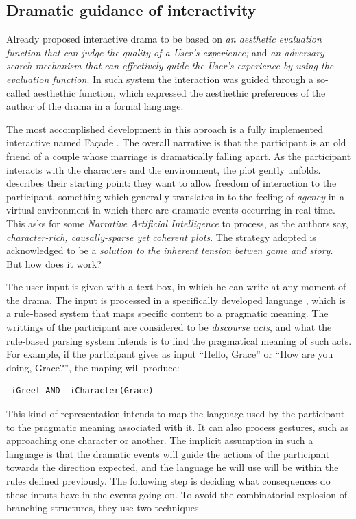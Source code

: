 \documentclass[
		twoside,openright,titlepage,numbers=noenddot,manychapters,
		headinclude,%
                footinclude=false,cleardoublepage=empty,
                BCOR=5mm,
		fontsize=11pt, %
                 enabledeprecatedfontcommands]{scrreprt}
\begin{document}
\subsection{Dramatic guidance of interactivity}

Already \cite{weyhrauch1997gid}   proposed interactive drama to be based on \emph{an aesthetic evaluation function that can judge the quality of a User's experience;} and \emph{an adversary search mechanism that can effectively guide the User's experience by using the evaluation function}. In such system the interaction was guided through a so-called aesthethic function, which expressed the aesthethic preferences of the author of the drama in a formal language.

The most accomplished development in this aproach is a fully implemented interactive named Fa{\c{c}}ade \cite[]{mateas2003feb}. The overall narrative is that the participant is an old friend of a couple whose marriage is dramatically falling apart. As the participant interacts with the characters and the environment, the plot gently unfolds. 
\cite{mateas2005structuring} describes their starting point: they want to allow freedom of interaction to the participant, something which generally translates in to the feeling of \emph{agency} in a virtual environment in which there are dramatic events occurring in real time. This asks for some \emph{Narrative Artificial Intelligence} to process, as the authors say, \emph{character-rich, causally-sparse yet coherent plots}. The strategy adopted is acknowledged to be a \emph{solution to the inherent tension betwen game and story}. But how does it work?

The user input is given with a text box, in which he can write at any moment of the drama. The input is processed in a specifically developed language \cite[]{mateas2004natural}, which is a rule-based system that maps specific content to a pragmatic meaning.  The writtings of the participant are considered to be \emph{discourse acts}, and what the rule-based parsing system intends is to find the pragmatical meaning of such acts. For example, if the participant gives as input ``Hello, Grace'' or ``How are you doing, Grace?'', the maping will produce:
\begin{lstlisting}
_iGreet AND _iCharacter(Grace)
\end{lstlisting}
This kind of representation intends to map the language used by the participant to the pragmatic meaning associated with it. It can also process gestures, such as approaching one character or another. The implicit assumption in such a language is that the dramatic events will guide the actions of the participant towards the direction expected, and the language he will use will be within the rules defined previously. The following step is deciding what consequences do these inputs have in the events going on. To avoid the combinatorial explosion of branching structures, they use two techniques.
\end{document}
